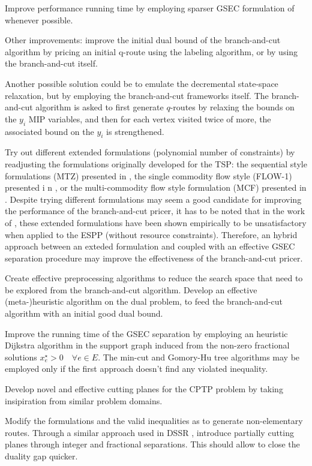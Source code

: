 Improve performance running time by employing
sparser GSEC formulation of 
whenever possible.

Other improvements: improve the initial dual bound of the branch-and-cut
algorithm by pricing an initial q-route using the labeling algorithm,
or by using the branch-and-cut itself.

Another possible solution could be to emulate the decremental state-space
relaxation, but by employing the branch-and-cut frameworks itself.
The branch-and-cut algorithm is asked to first generate $q$-routes by
relaxing the bounds on the $y_i$ MIP variables,
and then for each vertex visited twice of more, the associated bound
on the $y_i$ is strengthened.

Try out different extended formulations (polynomial number of constraints)
by readjusting the formulations originally developed for the TSP:
the sequential style formulations (MTZ) presented in \textcite{miller1960},
the single commodity flow style (FLOW-1) presented i n \textcite{gavish1978travelling},
or the multi-commodity flow style formulation (MCF) presented in \textcite{wong1980integer,claus1984new}.
Despite trying different formulations may seem a good candidate for improving
the performance of the branch-and-cut pricer,
it has to be noted that in the work of \textcite{taccari2016},
these extended formulations have been shown empirically
to be unsatisfactory when applied to the ESPP (without resource constraints).
Therefore, an hybrid approach between an exteded formulation
and coupled with an effective GSEC separation procedure may improve
the effectiveness of the branch-and-cut pricer.

Create effective preprocessing algorithms to reduce the search space
that need to be explored from the branch-and-cut algorithm.
Develop an effective (meta-)heuristic algorithm on the dual problem,
to feed the branch-and-cut algorithm with an initial good dual bound.

Improve the running time of the GSEC separation by employing an heuristic
Dijkstra algorithm in the support graph induced from the non-zero fractional solutions $x^\star_e > 0 \quad \forall e \in E$.
The min-cut and Gomory-Hu tree algorithms may be employed only if the first approach
doesn't find any violated inequality.

Develop novel and effective cutting planes for the CPTP problem by taking
insipiration from similar problem domains.

Modify the formulations and the valid inequalities as to generate non-elementary routes.
Through a similar approach used in DSSR \parencite{boland2006, righini2008, martinelli2014},
introduce partially cutting planes through integer and fractional separations.
This should allow to close the duality gap quicker.

